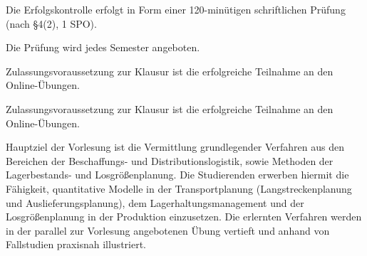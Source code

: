 \begin{course}

\setdoclanguagegerman
{}



\coursehead


\label{cour_7815.dp_997}


\begin{styleenv}
\begin{assessment}
Die Erfolgskontrolle erfolgt in Form einer 120-minütigen schriftlichen Prüfung (nach §4(2), 1 SPO).

 

Die Prüfung wird jedes Semester angeboten.

 

Zulassungsvoraussetzung zur Klausur ist die erfolgreiche Teilnahme an den Online-Übungen.


\end{assessment}

\begin{conditions}Zulassungsvoraussetzung zur Klausur ist die erfolgreiche Teilnahme an den Online-Übungen.

\end{conditions}


\end{styleenv}

\begin{learningoutcomes}
Hauptziel der Vorlesung ist die Vermittlung grundlegender Verfahren aus den Bereichen der Beschaffungs- und Distributionslogistik, sowie Methoden der Lagerbestands- und Losgrößenplanung. Die Studierenden erwerben hiermit die Fähigkeit, quantitative Modelle in der Transportplanung (Langstreckenplanung und Auslieferungsplanung), dem Lagerhaltungsmanagement und der Losgrößenplanung in der Produktion einzusetzen. Die erlernten Verfahren werden in der parallel zur Vorlesung angebotenen Übung vertieft und anhand von Fallstudien praxisnah illustriert.



\end{learningoutcomes}
\end{course}
